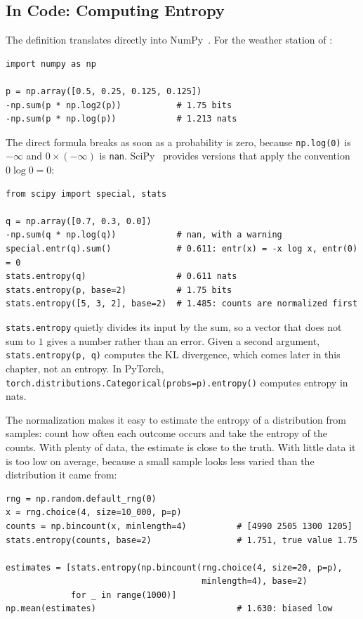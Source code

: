 \subsection{In Code: Computing Entropy}
\label{sec:ch07-entropy-code}

The definition translates directly into NumPy~\cite{harris2020numpy}.
For the weather station of :

\begin{lstlisting}
import numpy as np

p = np.array([0.5, 0.25, 0.125, 0.125])
-np.sum(p * np.log2(p))           # 1.75 bits
-np.sum(p * np.log(p))            # 1.213 nats
\end{lstlisting}

The direct formula breaks as soon as a probability is zero, because
\texttt{np.log(0)} is $-\infty$ and $0 \times (-\infty)$ is
\texttt{nan}. SciPy~\cite{virtanen2020scipy} provides versions that apply
the convention $0 \log 0 = 0$:

\begin{lstlisting}
from scipy import special, stats

q = np.array([0.7, 0.3, 0.0])
-np.sum(q * np.log(q))            # nan, with a warning
special.entr(q).sum()             # 0.611: entr(x) = -x log x, entr(0) = 0
stats.entropy(q)                  # 0.611 nats
stats.entropy(p, base=2)          # 1.75 bits
stats.entropy([5, 3, 2], base=2)  # 1.485: counts are normalized first
\end{lstlisting}

\begin{warning}
  \texttt{stats.entropy} quietly divides its input by the sum, so a vector
  that does not sum to $1$ gives a number rather than an error. Given a
  second argument, \texttt{stats.entropy(p, q)} computes the KL
  divergence, which comes later in this chapter, not an entropy. In
  PyTorch, \texttt{torch.distributions.Categorical(probs=p).entropy()}
  computes entropy in nats.
\end{warning}

The normalization makes it easy to estimate the entropy of a distribution
from samples: count how often each outcome occurs and take the entropy of
the counts. With plenty of data, the estimate is close to the truth. With
little data it is too low on average, because a small sample looks less
varied than the distribution it came from:

\begin{lstlisting}
rng = np.random.default_rng(0)
x = rng.choice(4, size=10_000, p=p)
counts = np.bincount(x, minlength=4)          # [4990 2505 1300 1205]
stats.entropy(counts, base=2)                 # 1.751, true value 1.75

estimates = [stats.entropy(np.bincount(rng.choice(4, size=20, p=p),
                                       minlength=4), base=2)
             for _ in range(1000)]
np.mean(estimates)                            # 1.630: biased low
\end{lstlisting}

